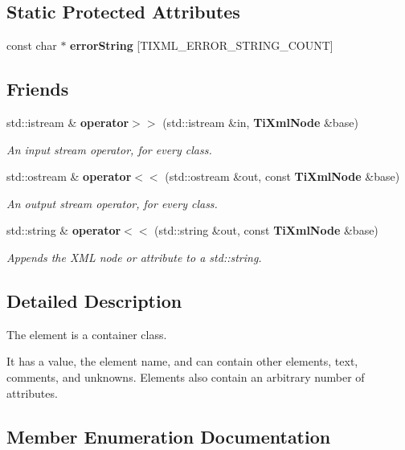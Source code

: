 \subsection*{Static Protected Attributes}
\begin{CompactItemize}
\item 
const char $\ast$ {\bf error\-String} [TIXML\_\-ERROR\_\-STRING\_\-COUNT]
\end{CompactItemize}
\subsection*{Friends}
\begin{CompactItemize}
\item 
std::istream \& {\bf operator$>$$>$} (std::istream \&in, {\bf Ti\-Xml\-Node} \&base)
\begin{CompactList}\small\item\em An input stream operator, for every class. \item\end{CompactList}\item 
std::ostream \& {\bf operator$<$$<$} (std::ostream \&out, const {\bf Ti\-Xml\-Node} \&base)
\begin{CompactList}\small\item\em An output stream operator, for every class. \item\end{CompactList}\item 
std::string \& {\bf operator$<$$<$} (std::string \&out, const {\bf Ti\-Xml\-Node} \&base)\label{classTiXmlNode_TiXmlUnknownn2}

\begin{CompactList}\small\item\em Appends the XML node or attribute to a std::string. \item\end{CompactList}\end{CompactItemize}


\subsection{Detailed Description}
The element is a container class. 

It has a value, the element name, and can contain other elements, text, comments, and unknowns. Elements also contain an arbitrary number of attributes. 



\subsection{Member Enumeration Documentation}
